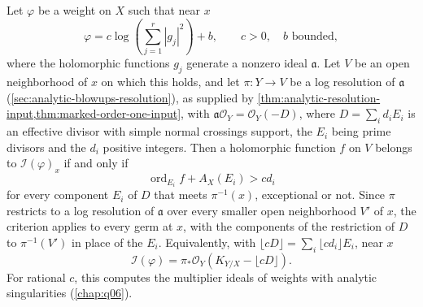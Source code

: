\begin{theorem}\label{thm:analytic-log-resolution-integrability}
Let $\varphi$ be a weight on $X$ such that near $x$
\[
 \varphi=c\log\left(\sum_{j=1}^r|g_j|^2\right)+b,
 \qquad c>0,\quad b\text{ bounded},
\]
where the holomorphic functions $g_j$ generate a nonzero ideal $\mathfrak a$. Let $V$ be an open neighborhood of $x$ on which this holds, and let $\pi\colon Y\to V$ be a log resolution of $\mathfrak a$ (\cref{sec:analytic-blowups-resolution}), as supplied by \cref{thm:analytic-resolution-input,thm:marked-order-one-input}, with $\mathfrak a\mathcal O_Y=\mathcal O_Y(-D)$, where $D=\sum_id_iE_i$ is an effective divisor with simple normal crossings support, the $E_i$ being prime divisors and the $d_i$ positive integers. Then a holomorphic function $f$ on $V$ belongs to $\mathcal I(\varphi)_x$ if and only if
\begin{equation}\label{eq:analytic-strict-valuative-threshold}
 \operatorname{ord}_{E_i}f+A_X(E_i)>c d_i
\end{equation}
for every component $E_i$ of $D$ that meets $\pi^{-1}(x)$, exceptional or not. Since $\pi$ restricts to a log resolution of $\mathfrak a$ over every smaller open neighborhood $V'$ of $x$, the criterion applies to every germ at $x$, with the components of the restriction of $D$ to $\pi^{-1}(V')$ in place of the $E_i$. Equivalently, with $\lfloor cD\rfloor=\sum_i\lfloor cd_i\rfloor E_i$, near $x$
\begin{equation}\label{eq:analytic-multiplier-divisor-formula}
 \mathcal I(\varphi)=\pi_*\mathcal O_Y(K_{Y/X}-\lfloor cD\rfloor).
\end{equation}
For rational $c$, this computes the multiplier ideals of weights with analytic singularities (\cref{chap:q06}).
\end{theorem}
